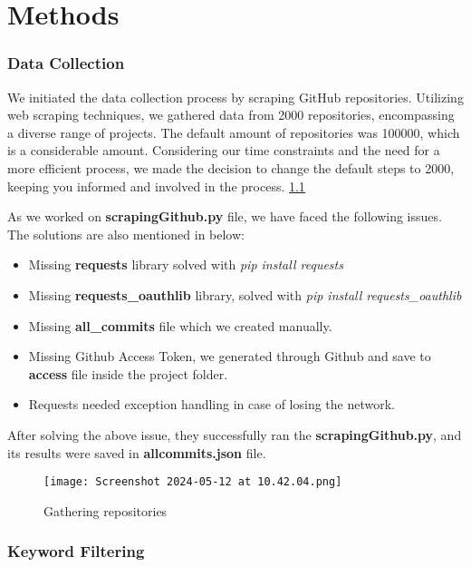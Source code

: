 \chapter{Methods}\label{chap:methods}

\subsection{Data Collection}

We initiated the data collection process by scraping GitHub repositories. 
Utilizing web scraping techniques, we gathered data from 2000 repositories, encompassing a diverse range of projects. 
The default amount of repositories was 100000, which is a considerable amount. 
Considering our time constraints and the need for a more efficient process, we made the decision to change the default steps to 2000, keeping you informed and involved in the process. \ref{fig:srapingLabel}

As we worked on \textbf{scrapingGithub.py} file, we have faced the following issues. The solutions are also mentioned in below:
\begin{itemize}
    \item Missing \textbf{requests} library solved with \textit{ pip install requests }
    \item Missing \textbf{requests\_oauthlib} library, solved with  \textit{pip install requests\_oauthlib}
    \item Missing \textbf{all\_commits} file which we created manually.
    \item Missing Github Access Token, we generated through Github and save to \textbf{access} file inside the project folder. 
    \item Requests needed exception handling in case of losing the network.
\end{itemize}

After solving the above issue, they successfully ran the \textbf{scrapingGithub.py}, and its results were saved in \textbf{allcommits.json} file.

\begin{figure}
    \centering
    \texttt{[image: Screenshot 2024-05-12 at 10.42.04.png]}
    \caption{Gathering repositories}
    \label{fig:srapingLabel}
\end{figure}


\subsection{Keyword Filtering}

